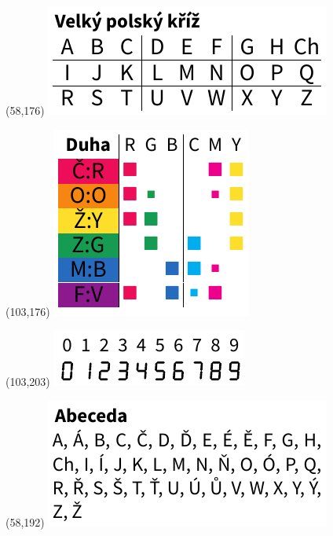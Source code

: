 \documentclass{extarticle}
\begin{document}
\begin{textblock}{0}(58,176)%
\vfill
{\includegraphics[scale=0.7]{tools/rosicrucian-polish.pdf}}
\vfill
\end{textblock}

\begin{textblock}{0}(103,176)%
\vfill
{\includegraphics[scale=0.7]{tools/rainbow-v2.pdf}}
\vfill
\end{textblock}

\begin{textblock}{0}(103,203)%
\vfill
{\includegraphics[scale=0.7]{tools/digits.pdf}}
\vfill
\end{textblock}

\begin{textblock}{0}(58,192)%
\vfill
{\includegraphics[scale=0.7]{tools/alphabet.pdf}}
\vfill
\end{textblock}
\end{document}
